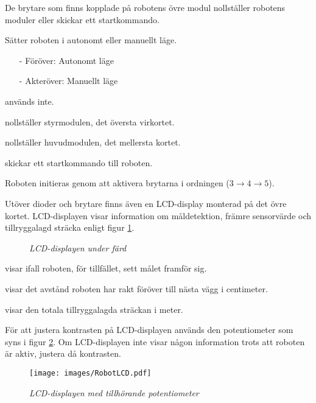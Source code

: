 \documentclass[11pt]{article}
\begin{document}
De brytare som finns kopplade på robotens övre modul nollställer robotens moduler eller skickar ett startkommando. 
\begin{description}[style=unboxed, leftmargin=0cm]
  \item[Brytare 1] Sätter roboten i autonomt eller manuellt läge. 
    \begin{itemize}
      \setlength\itemsep{-0.5em}
      \item[-] Föröver: Autonomt läge
      \item[-] Akteröver: Manuellt läge
    \end{itemize}
  \item[Brytare 2] används inte.
  \item[Brytare 3] nollställer styrmodulen, det översta virkortet.
  \item[Brytare 4] nollställer huvudmodulen, det mellersta kortet.
  \item[Brytare 5] skickar ett startkommando till roboten.
\end{description}

Roboten initieras genom att aktivera brytarna i ordningen ($3 \rightarrow 4 \rightarrow 5$).

Utöver dioder och brytare finns även en LCD-display monterad på det övre kortet. LCD-displayen visar information om måldetektion, främre sensorvärde och tillryggalagd sträcka enligt figur \ref{lcd}.

\begin{figure}[htbp]
	\centering
	
	\caption{\textit{LCD-displayen under färd} \label{lcd}}
\end{figure}

\begin{description}[style=unboxed, leftmargin=0cm]
  \item[Target] visar ifall roboten, för tillfället, sett målet framför sig.
  \item[Forw] visar det avstånd roboten har rakt föröver till nästa vägg i centimeter.
  \item[Trip] visar den totala tillryggalagda sträckan i meter.
\end{description}

För att justera kontrasten på LCD-displayen används den potentiometer som syns i figur \ref{lcdPot}. Om LCD-displayen inte visar någon information trots att roboten är aktiv, justera då kontrasten.


\begin{figure}[htbp]
	\centering
	\texttt{[image: images/RobotLCD.pdf]}
	\caption{\textit{LCD-displayen med tillhörande potentiometer} \label{lcdPot}}
\end{figure}
\end{document}
